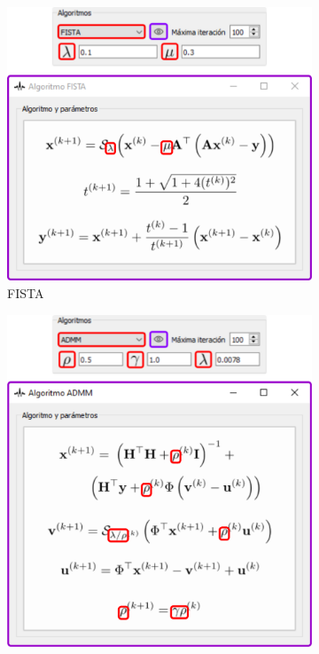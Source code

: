 \documentclass[12pt,twoside,letter]{ol-softwaremanual}
\begin{document}
\begin{figure}[!ht]
     \centering
     \begin{subfigure}[b]{0.47\textwidth}
         \centering
         \includegraphics[width=\textwidth]{algorithm-fista.png}
         \caption{FISTA}
         \label{fig:fista}
     \end{subfigure}
     \hfill
     \begin{subfigure}[b]{0.47\textwidth}
         \centering
         \includegraphics[width=\textwidth]{algorithm-admm.png}

\end{subfigure}
\end{figure}
\end{document}

